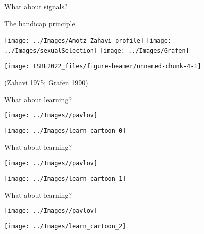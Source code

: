 \documentclass[
  ignorenonframetext,
  aspectratio=169]{beamer}
\begin{document}
\begin{frame}{What about signals?}
\protect\hypertarget{what-about-signals}{}
\begin{block}{The handicap principle}
\protect\hypertarget{the-handicap-principle}{}
\begin{center}\texttt{[image: ../Images/Amotz\_Zahavi\_profile]} \texttt{[image: ../Images/sexualSelection]} \texttt{[image: ../Images/Grafen]} \end{center}

\begin{center}\texttt{[image: ISBE2022\_files/figure-beamer/unnamed-chunk-4-1]} \end{center}
\vspace{-0.3cm}

(Zahavi 1975; Grafen 1990)
\end{block}
\end{frame}

\begin{frame}{What about learning?}
\protect\hypertarget{what-about-learning}{}
\begin{center}\texttt{[image: ../Images//pavlov]} \end{center}

\begin{center}\texttt{[image: ../Images/learn\_cartoon\_0]} \end{center}
\end{frame}

\begin{frame}{What about learning?}
\protect\hypertarget{what-about-learning-1}{}
\begin{center}\texttt{[image: ../Images//pavlov]} \end{center}

\begin{center}\texttt{[image: ../Images/learn\_cartoon\_1]} \end{center}
\end{frame}

\begin{frame}{What about learning?}
\protect\hypertarget{what-about-learning-2}{}
\begin{center}\texttt{[image: ../Images//pavlov]} \end{center}

\begin{center}\texttt{[image: ../Images/learn\_cartoon\_2]} \end{center}
\end{frame}
\end{document}
